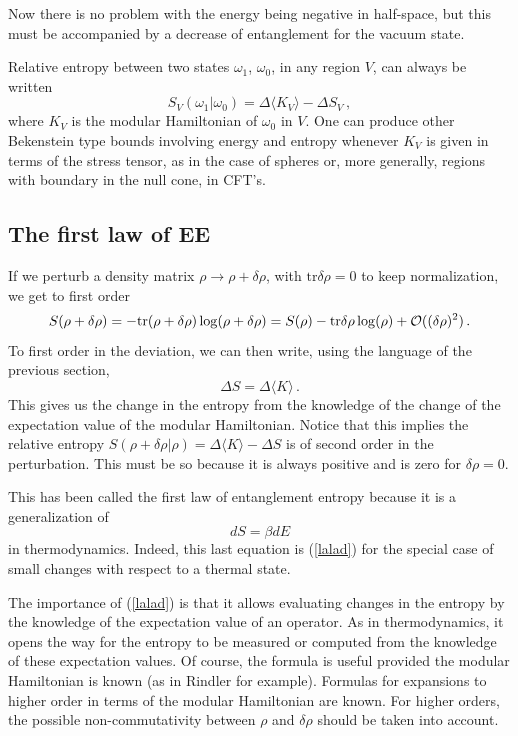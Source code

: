 \documentclass[11pt]{article}
\numberwithin{equation}{section}
\newcommand{\be}{\begin{equation}}
\newcommand{\ee}{\end{equation}}
\begin{document}
Now there is no problem with the energy being negative in half-space, but this must be accompanied by a decrease of entanglement for the vacuum state.  

Relative entropy between two states $\omega_1$, $\omega_0$, in any region $V$, can always be written 
\be
S_V(\omega_1|\omega_0)=\Delta \langle K_V \rangle - \Delta S_V\,,
\ee
where $K_V$ is the modular Hamiltonian of $\omega_0$ in $V$. One can produce other Bekenstein type bounds involving energy and entropy whenever $K_V$ is given in terms of the stress tensor, as in the case of spheres or, more generally, regions with boundary in the null cone, in CFT's. 


\subsection{The first law of EE}

If we perturb a density matrix $\rho \rightarrow \rho+\delta \rho$, with $\textrm{tr} \delta \rho=0$ to keep normalization, we get to first order
\be
S(\rho+\delta\rho)= - \textrm{tr}  (\rho+\delta\rho) \log(\rho+\delta\rho)
=S(\rho)- \textrm{tr}  \delta\rho \log(\rho)+{\cal O}((\delta \rho)^2)\,.
\ee
To first order in the deviation, we can then write, using the language of the previous section, 
\be
\Delta S=\Delta \langle K\rangle\,.\label{lalad}
\ee
This gives us the change in the entropy from the knowledge of the change of the expectation value of the modular Hamiltonian. Notice that this implies the relative entropy $S(\rho+\delta \rho |\rho)=\Delta \langle K \rangle-\Delta S$ is of second order in the perturbation. This must be so because it is always positive and is zero for $\delta \rho=0$.

This has been called the first law of entanglement entropy because it is a generalization of 
\be
dS=\beta dE
\ee
in thermodynamics. Indeed, this last equation is (\ref{lalad}) for the special case of small changes with respect to a thermal state.    

The importance of (\ref{lalad}) is that it allows evaluating changes in the entropy by the knowledge of the expectation value of an operator. As in thermodynamics, it opens the way for the entropy to be measured or computed from the knowledge of these expectation values. Of course, the formula is useful provided the modular Hamiltonian is known (as in Rindler for example). Formulas for expansions to higher order in terms of the modular Hamiltonian are known. For higher orders, the possible non-commutativity between $\rho$ and $\delta \rho$ should be taken into account.  
\end{document}

